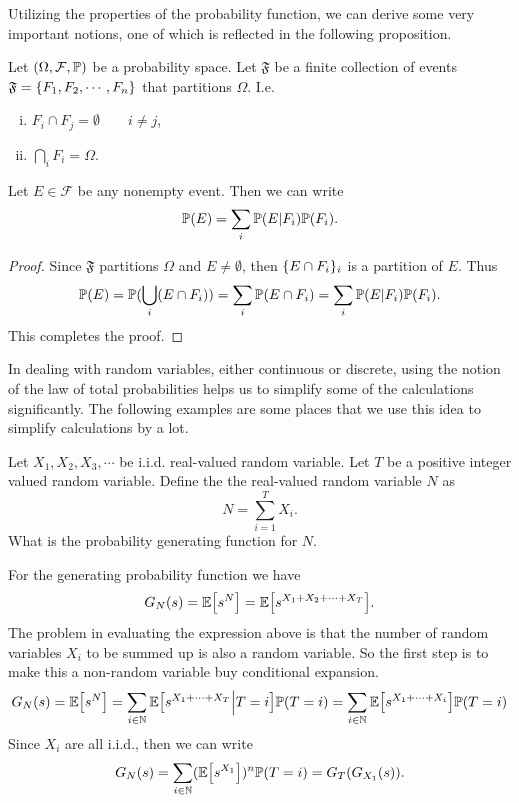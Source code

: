 Utilizing the properties of the probability function, we can derive some very important notions, one of which is reflected in the following proposition.

\begin{proposition}
	Let $(\Omega, \mathcal{F}, \mathbb{P})$ be a probability space. Let $\mathfrak{F}$ be a finite collection of events $\mathfrak{F} = \{F_1,F_2,\cdots, F_n\}$ that partitions $\Omega$. I.e.
	\begin{enumerate}[(i)]
		\item $F_i \cap F_j = \emptyset \qquad i\neq j$,
		\item $\bigcap_{i} F_i = \Omega$.
	\end{enumerate}
	Let $E \in \mathcal{F}$ be any nonempty event. Then we can write
	\[  \mathbb{P}(E) = \sum_{i} \mathbb{P}(E|F_i)\mathbb{P}(F_i). \]
\end{proposition}
\begin{proof}
	Since $\mathfrak{F}$ partitions $\Omega$ and $E \neq \emptyset$, then $\{E\cap F_i\}_i$ is a partition of $E$. Thus
	\[ \mathbb{P}(E) = \mathbb{P}(\bigcup_i (E \cap F_i)) = \sum_i \mathbb{P}(E \cap F_i) = \sum_i \mathbb{P}(E|F_i)\mathbb{P}(F_i). \]
	This completes the proof.
\end{proof}


In dealing with random variables, either continuous or discrete, using the notion of the law of total probabilities helps us to simplify some of the calculations significantly. The following examples are some places that we use this idea to simplify calculations by a lot. 

\begin{example}
	Let $ X_1, X_2, X_3, \cdots $ be i.i.d. real-valued random variable. Let $ T $ be a positive integer valued random variable. Define the the real-valued random variable $ N $ as 
	\[ N = \sum_{i=1}^{T} X_i. \]
	What is the probability generating function for $ N $.
	
	\begin{solution}
		For the generating probability function we have
		\[ G_N(s) = \mathbb{E}\big[s^N\big] = \mathbb{E}\big[s^{X_1+X_2+\cdots+X_T}\big]. \]
		The problem in evaluating the expression above is that the number of random variables $ X_i $ to be summed up is also a random variable. So the first step is to make this a non-random variable buy conditional expansion.
		\[ G_N(s) = \mathbb{E}\big[s^N\big] = \sum_{i\in\mathbb{N}}\mathbb{E}\big[s^{X_1+\cdots+X_T}\big|T=i\big]\mathbb{P}(T=i) = \sum_{i\in\mathbb{N}}\mathbb{E}\big[s^{X_1+\cdots+X_i}\big]\mathbb{P}(T=i) \]
		Since $ X_i $ are all i.i.d., then we can write
		\[ G_N(s) = \sum_{i\in\mathbb{N}}(\mathbb{E}\big[s^{X_1}\big])^n\mathbb{P}(T=i) = G_T(G_{X_1}(s)). \]
	\end{solution}
\end{example}

